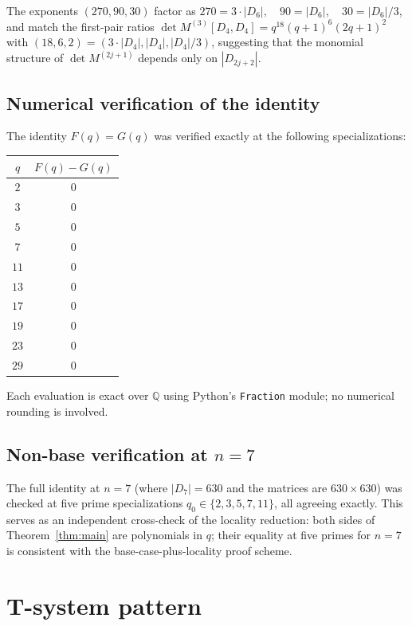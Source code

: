 \documentclass[11pt]{article}
\theoremstyle{definition}
\begin{document}
The exponents $(270, 90, 30)$ factor as
$270 = 3 \cdot |D_6|, \quad 90 = |D_6|, \quad 30 = |D_6|/3$,
and match the first-pair ratios
$\det M^{(3)}[D_4, D_4] = q^{18}(q+1)^6(2q+1)^2$
with $(18, 6, 2) = (3 \cdot |D_4|, |D_4|, |D_4|/3)$, suggesting that the
monomial structure of $\det M^{(2j+1)}$ depends only on $|D_{2j+2}|$.

\subsection{Numerical verification of the identity}

The identity $F(q) = G(q)$ was verified exactly at the following specializations:

\begin{center}
\begin{tabular}{|c|c|}
\hline
$q$ & $F(q) - G(q)$ \\
\hline
$2$  & $0$ \\
$3$  & $0$ \\
$5$  & $0$ \\
$7$  & $0$ \\
$11$ & $0$ \\
$13$ & $0$ \\
$17$ & $0$ \\
$19$ & $0$ \\
$23$ & $0$ \\
$29$ & $0$ \\
\hline
\end{tabular}
\end{center}

Each evaluation is exact over $\mathbb{Q}$ using Python's \texttt{Fraction}
module; no numerical rounding is involved.

\subsection{Non-base verification at $n = 7$}

The full identity at $n = 7$ (where $|D_7| = 630$ and the matrices are
$630 \times 630$) was checked at five prime specializations
$q_0 \in \{2, 3, 5, 7, 11\}$, all agreeing exactly. This serves as an
independent cross-check of the locality reduction: both sides of
Theorem~\ref{thm:main} are polynomials in $q$; their equality at five primes for
$n = 7$ is consistent with the base-case-plus-locality proof scheme.

\section{T-system pattern}
\label{sec:tsystem}
\end{document}
